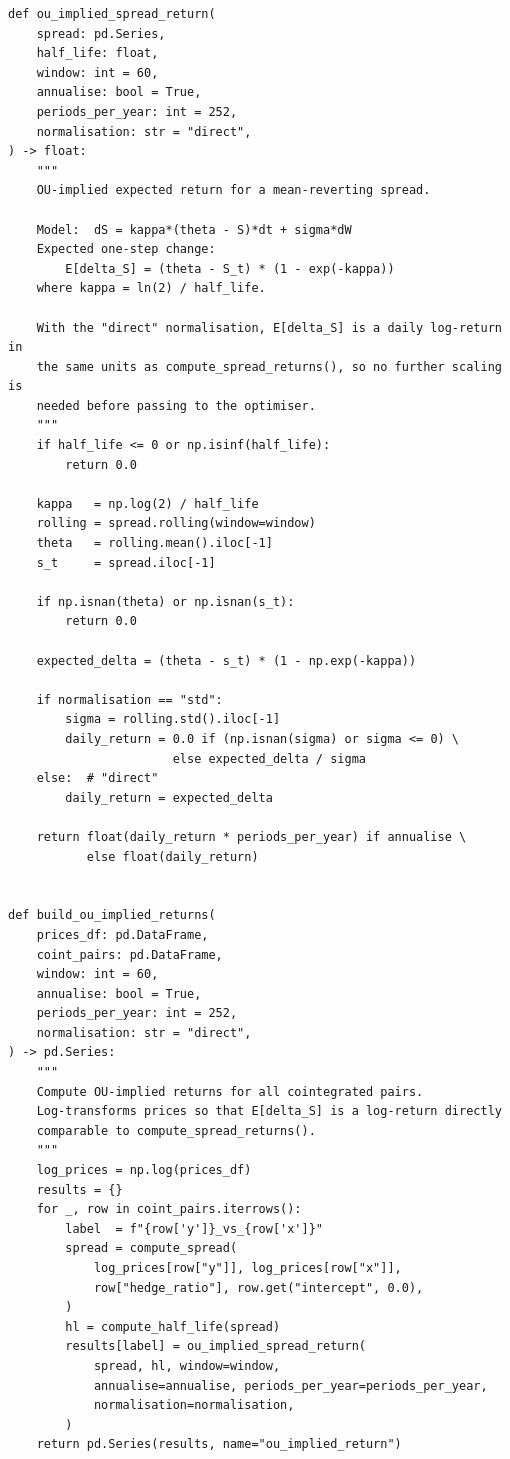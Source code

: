 \documentclass[a4paper]{report}
\begin{document}
\begin{Verbatim}[fontsize=\footnotesize, baselinestretch=0.85]
def ou_implied_spread_return(
    spread: pd.Series,
    half_life: float,
    window: int = 60,
    annualise: bool = True,
    periods_per_year: int = 252,
    normalisation: str = "direct",
) -> float:
    """
    OU-implied expected return for a mean-reverting spread.

    Model:  dS = kappa*(theta - S)*dt + sigma*dW
    Expected one-step change:
        E[delta_S] = (theta - S_t) * (1 - exp(-kappa))
    where kappa = ln(2) / half_life.

    With the "direct" normalisation, E[delta_S] is a daily log-return in
    the same units as compute_spread_returns(), so no further scaling is
    needed before passing to the optimiser.
    """
    if half_life <= 0 or np.isinf(half_life):
        return 0.0

    kappa   = np.log(2) / half_life
    rolling = spread.rolling(window=window)
    theta   = rolling.mean().iloc[-1]
    s_t     = spread.iloc[-1]

    if np.isnan(theta) or np.isnan(s_t):
        return 0.0

    expected_delta = (theta - s_t) * (1 - np.exp(-kappa))

    if normalisation == "std":
        sigma = rolling.std().iloc[-1]
        daily_return = 0.0 if (np.isnan(sigma) or sigma <= 0) \
                       else expected_delta / sigma
    else:  # "direct"
        daily_return = expected_delta

    return float(daily_return * periods_per_year) if annualise \
           else float(daily_return)


def build_ou_implied_returns(
    prices_df: pd.DataFrame,
    coint_pairs: pd.DataFrame,
    window: int = 60,
    annualise: bool = True,
    periods_per_year: int = 252,
    normalisation: str = "direct",
) -> pd.Series:
    """
    Compute OU-implied returns for all cointegrated pairs.
    Log-transforms prices so that E[delta_S] is a log-return directly
    comparable to compute_spread_returns().
    """
    log_prices = np.log(prices_df)
    results = {}
    for _, row in coint_pairs.iterrows():
        label  = f"{row['y']}_vs_{row['x']}"
        spread = compute_spread(
            log_prices[row["y"]], log_prices[row["x"]],
            row["hedge_ratio"], row.get("intercept", 0.0),
        )
        hl = compute_half_life(spread)
        results[label] = ou_implied_spread_return(
            spread, hl, window=window,
            annualise=annualise, periods_per_year=periods_per_year,
            normalisation=normalisation,
        )
    return pd.Series(results, name="ou_implied_return")
\end{Verbatim}
\end{document}
